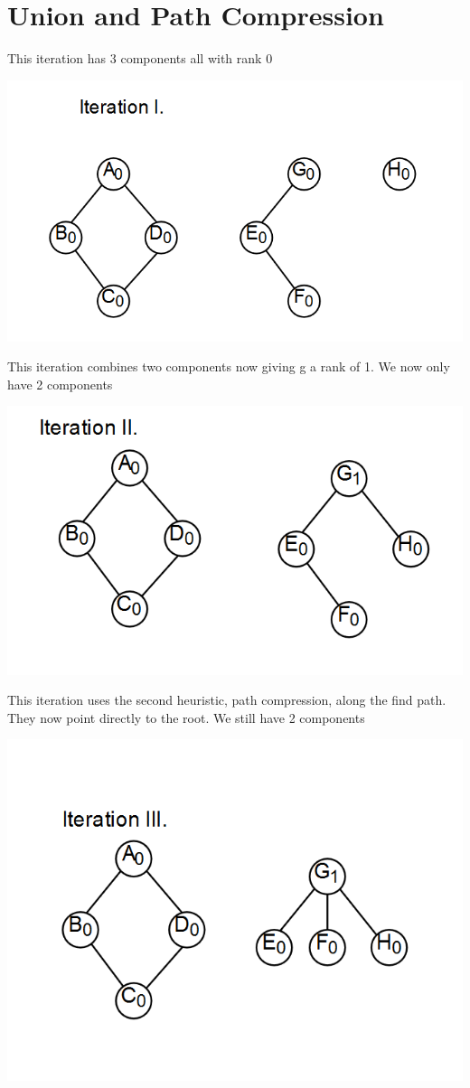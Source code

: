 \documentclass[10pt,a4paper]{article}
\begin{document}
\section{Union and Path Compression}
This iteration has 3 components all with rank 0

	\includegraphics[scale = .5]{boi1.PNG}

This iteration combines two components now giving g a rank of 1. We now only have 2 components

	\includegraphics[scale = .5]{boi2.PNG}

This iteration uses the second heuristic, path compression, along the find path. They now point directly to the root. We still have 2 components

	\includegraphics[scale = .5]{boi3.PNG}
\end{document}
